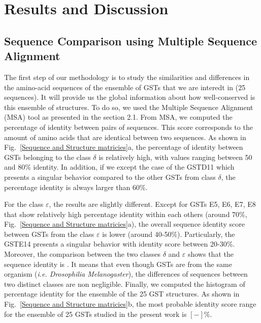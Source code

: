 \chapter{Results and Discussion}

\section{Sequence Comparison using Multiple Sequence Alignment}

The first step of our methodology is to study the similarities and differences in the amino-acid sequences of the ensemble of GSTs that we are interedt in (25 sequences). It will provide us the global information about how well-conserved is this ensemble of structures. To do so, we used the Multiple Sequence Alignment (MSA) tool as presented in the section 2.1. From MSA, we computed the percentage of identity between pairs of sequences. This score corresponds to the amount of amino acids that are identical between two sequences. As shown in Fig.~\ref{Sequence and Structure matricies}a, the percentage of identity between GSTs belonging to the class $\delta$ is relatively high, with values ranging between 50 and 80\% identity. In addition, if we except the case of the GSTD11 which presents a singular behavior compared to the other GSTs from class $\delta$, the percentage identity is always larger than 60\%.

For the class $\varepsilon$, the results are slightly different. Except for GSTs E5, E6, E7, E8 that show relatively high percentage identity within each others (around 70\%, Fig.~\ref{Sequence and Structure matricies}a), the overall sequence identity score between GSTs from the class $\varepsilon$ is lower (around 40-50\%). Particularly, the GSTE14 presents a singular behavior with identity score between 20-30\%. Moreover, the comparison between the two classes $\delta$ and $\varepsilon$ shows that the sequence identity is . It means that even though GSTs are from the same organism (\textit{i.e. Drosophilia Melanogaster}), the differences of sequences between two distinct classes are non negligible. Finally, we computed the histogram of percentage identity for the ensemble of the 25 GST structures. As shown in Fig.~\ref{Sequence and Structure matricies}b, the most probable identity score range for the ensemble of 25 GSTs studied in the present work is $[-]$\%. 

